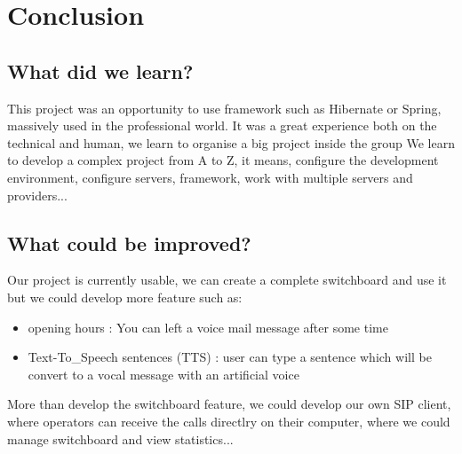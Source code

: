\chapter{Conclusion}

\section{What did we learn?}

This project was an opportunity to use framework such as Hibernate or Spring, massively used in the professional world.
It was a great experience both on the technical and human, we learn to organise a big project inside the group
We learn to develop a complex project from A to Z, it means, configure the development environment, configure servers, framework, work with multiple servers and providers...

\section{What could be improved?}

Our project is currently usable, we can create a complete switchboard and use it but we could develop more feature such as:

\begin{itemize}  
\item opening hours : You can left a voice mail message after some time
\item Text-To_Speech sentences (TTS) : user can type a sentence which will be convert to a vocal message with an artificial voice
\end{itemize}  

More than develop the switchboard feature, we could develop our own SIP client, where operators can receive the calls directlry on their computer, where we could manage switchboard and view statistics...

